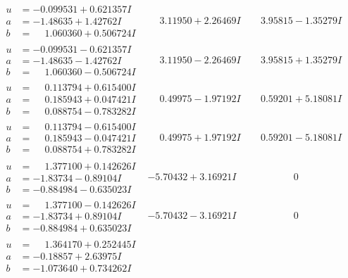 \documentclass[1p]{elsarticle_modified}
\theoremstyle{definition}
\begin{document}
$$\begin{array}{c|c|c}
\begin{aligned}
u &= -0.099531 + 0.621357 I \\
a &= -1.48635 + 1.42762 I \\
b &= \phantom{-}1.060360 + 0.506724 I\end{aligned}
 & \phantom{-}3.11950 + 2.26469 I & \phantom{-}3.95815 - 1.35279 I \\ \hline\begin{aligned}
u &= -0.099531 - 0.621357 I \\
a &= -1.48635 - 1.42762 I \\
b &= \phantom{-}1.060360 - 0.506724 I\end{aligned}
 & \phantom{-}3.11950 - 2.26469 I & \phantom{-}3.95815 + 1.35279 I \\ \hline\begin{aligned}
u &= \phantom{-}0.113794 + 0.615400 I \\
a &= \phantom{-}0.185943 + 0.047421 I \\
b &= \phantom{-}0.088754 - 0.783282 I\end{aligned}
 & \phantom{-}0.49975 - 1.97192 I & \phantom{-}0.59201 + 5.18081 I \\ \hline\begin{aligned}
u &= \phantom{-}0.113794 - 0.615400 I \\
a &= \phantom{-}0.185943 - 0.047421 I \\
b &= \phantom{-}0.088754 + 0.783282 I\end{aligned}
 & \phantom{-}0.49975 + 1.97192 I & \phantom{-}0.59201 - 5.18081 I \\ \hline\begin{aligned}
u &= \phantom{-}1.377100 + 0.142626 I \\
a &= -1.83734 - 0.89104 I \\
b &= -0.884984 - 0.635023 I\end{aligned}
 & -5.70432 + 3.16921 I & \phantom{-0.000000 } 0 \\ \hline\begin{aligned}
u &= \phantom{-}1.377100 - 0.142626 I \\
a &= -1.83734 + 0.89104 I \\
b &= -0.884984 + 0.635023 I\end{aligned}
 & -5.70432 - 3.16921 I & \phantom{-0.000000 } 0 \\ \hline\begin{aligned}
u &= \phantom{-}1.364170 + 0.252445 I \\
a &= -0.18857 + 2.63975 I \\
b &= -1.073640 + 0.734262 I\end{aligned}

\end{array}$$
\end{document}
